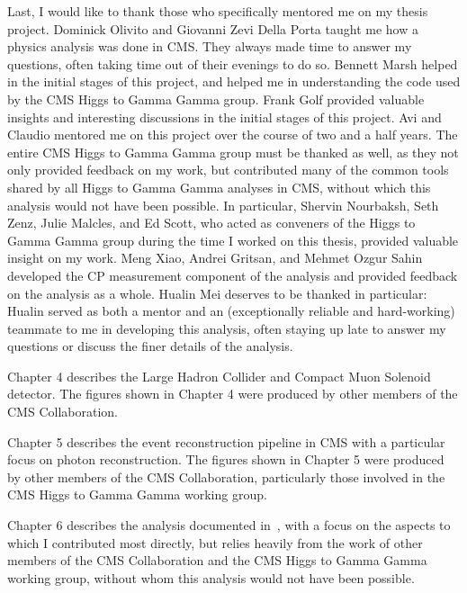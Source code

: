 \begin{frontmatter}
\begin{acknowledgements}
    Last, I would like to thank those who specifically mentored me on my thesis project.
    Dominick Olivito and Giovanni Zevi Della Porta taught me how a physics analysis was done in CMS. They always made time to answer my questions, often taking time out of their evenings to do so.
    Bennett Marsh helped in the initial stages of this project, and helped me in understanding the code used by the CMS Higgs to Gamma Gamma group.
    Frank Golf provided valuable insights and interesting discussions in the initial stages of this project.
    Avi and Claudio mentored me on this project over the course of two and a half years.
    The entire CMS Higgs to Gamma Gamma group must be thanked as well, as they not only provided feedback on my work, but contributed many of the common tools shared by all Higgs to Gamma Gamma analyses in CMS, without which this analysis would not have been possible.
    In particular, Shervin Nourbaksh, Seth Zenz, Julie Malcles, and Ed Scott, who acted as conveners of the Higgs to Gamma Gamma group during the time I worked on this thesis, provided valuable insight on my work.
    Meng Xiao, Andrei Gritsan, and Mehmet Ozgur Sahin developed the CP measurement component of the analysis and provided feedback on the analysis as a whole.
    Hualin Mei deserves to be thanked in particular: Hualin served as both a mentor and an (exceptionally reliable and hard-working) teammate to me in developing this analysis, often staying up late to answer my questions or discuss the finer details of the analysis.

    Chapter 4 describes the Large Hadron Collider and Compact Muon Solenoid detector.
    The figures shown in Chapter 4 were produced by other members of the CMS Collaboration.
    
    Chapter 5 describes the event reconstruction pipeline in CMS with a particular focus on photon reconstruction.
    The figures shown in Chapter 5 were produced by other members of the CMS Collaboration, particularly those involved in the CMS Higgs to Gamma Gamma working group.

    Chapter 6 describes the \ttH analysis documented in~\cite{tth_observation}, with a focus on the aspects to which I contributed most directly, but relies heavily from the work of other members of the CMS Collaboration and the CMS Higgs to Gamma Gamma working group, without whom this analysis would not have been possible.


\end{acknowledgements}
\end{frontmatter}
